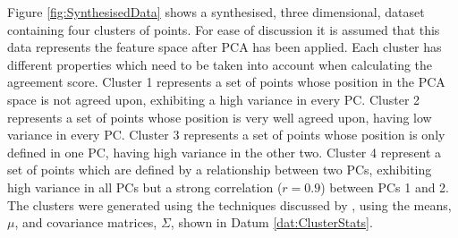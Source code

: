 			Figure \ref{fig:SynthesisedData} shows a synthesised, three dimensional, dataset containing four
			clusters of points. For ease of discussion it is assumed that this data represents the feature
			space after PCA has been applied. Each cluster has different properties which need to be taken into
			account when calculating the agreement score. Cluster 1 represents a set of points whose position
			in the PCA space is not agreed upon, exhibiting a high variance in every PC. Cluster 2 represents a
			set of points whose position is very well agreed upon, having low variance in every PC. Cluster 3
			represents a set of points whose position is only defined in one PC, having high variance in the
			other two. Cluster 4 represent a set of points which are defined by a relationship between two PCs,
			exhibiting high variance in all PCs but a strong correlation ($r = 0.9$) between PCs 1 and 2. The
			clusters were generated using the techniques discussed by \citet{ripley1987stochastic}, using the
			means, $\mu$, and covariance matrices, $\Sigma$, shown in Datum \ref{dat:ClusterStats}.

